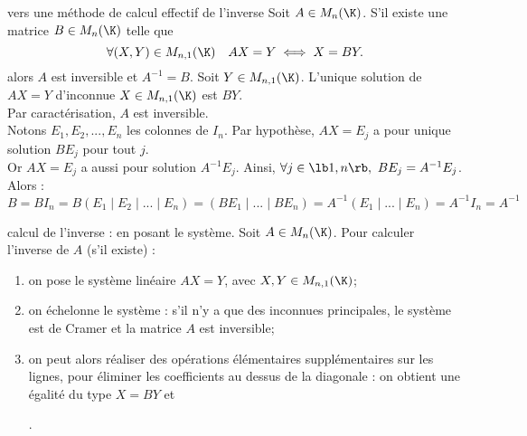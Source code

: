 \documentclass[11pt]{article}
\begin{document}
\begin{corr}{vers une méthode de calcul effectif de l'inverse}{}
    Soit $A\in M_n(\K)$. S'il existe une matrice $B\in M_n(\K)$ telle que
    \begin{equation*}
        \forall (X,Y) \in M_{n,1}(\K) \quad AX=Y \iff X=BY.
    \end{equation*}
    alors $A$ est inversible et $A^{-1}=B$.
    \tcblower
    Soit $Y\in M_{n,1}(\K)$. L'unique solution de $AX=Y$ d'inconnue $X\in M_{n,1}(\K)$ est $BY$.\\
    Par caractérisation, $A$ est inversible.\\
    Notons $E_1,E_2,...,E_n$ les colonnes de $I_n$. Par hypothèse, $AX=E_j$ a pour unique solution $BE_j$ pour tout $j$.\\
    Or $AX=E_j$ a aussi pour solution $A^{-1}E_j$. Ainsi, $\forall j \in \lb1,n\rb, ~ BE_j=A^{-1}E_j$. Alors :
    \begin{equation*}
        B=BI_n = B(E_1\mid E_2 \mid ... \mid E_n) = (BE_1 \mid ... \mid BE_n) = A^{-1}(E_1 \mid ... \mid E_n) = A^{-1}I_n = A^{-1} 
    \end{equation*}
\end{corr}

\begin{meth}{calcul de l'inverse : en posant le système.}{}
    Soit $A\in M_n(\K)$. Pour calculer l'inverse de $A$ (s'il existe) :
    \begin{enumerate}
        \item on pose le système linéaire $AX=Y$, avec $X,Y\in M_{n,1}(\K)$;
        \item on échelonne le système : s'il n'y a que des inconnues principales, le système est de Cramer et la matrice $A$ est inversible;
        \item on peut alors réaliser des opérations élémentaires supplémentaires sur les lignes, pour éliminer les coefficients au dessus de la diagonale : on obtient une égalité du type $X=BY$ et
        \begin{center}
            .
        \end{center}
    \end{enumerate}
\end{meth}
\end{document}
